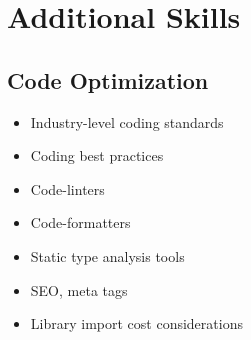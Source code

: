 \documentclass[letterpaper]{deedy-resume} %
\begin{document}
\begin{minipage}[t]{0.33\textwidth} %





\section{Additional Skills}




\subsection{Code Optimization}

\begin{itemize}
\setlength\itemsep{-0.5em} %
\item Industry-level coding standards
\item Coding best practices
\item Code-linters
\item Code-formatters
\item Static type analysis tools
\item SEO, meta tags
\item Library import cost considerations
\end{itemize}


\end{minipage}
\end{document}

